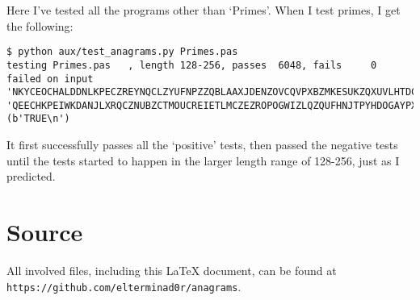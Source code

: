 \documentclass{article}
\begin{document}
    Here I've tested all the programs other than `Primes'. When I test primes,
    I get the following:

\begin{lstlisting}[caption=Testing `Primes']
$ python aux/test_anagrams.py Primes.pas
testing Primes.pas   , length 128-256, passes  6048, fails     0
failed on input 'NKYCEOCHALDDNLKPECZREYNQCLZYUFNPZZQBLAAXJDENZOVCQVPXBZMKESUKZQXUVLHTDCIJVAEQFHHWVVCDPJWSIOKIKUVJIGSKPQMDMUDDWFMZYPATESQNTBUYHRZDHBWADIXBCEKSQQYZVOEIXPZLOCIOVLQHDEKEPRAHQCOAEEMYUECGGCPACBRSQXT', 'QEECHKPEIWKDANJLXRQCZNUBZCTMOUCREIETLMCZEZROPOGWIZLQZQUFHNJTPYHDOGAYPXBBNSETCULSVCSKJBAYQAFYLQXECVQKDTVXANQODDHJMSQPDAHOXEZEZCSEGVXBMYLHUPIEISZNVKQCVCKKOHVRIWYIAKDBYAUVLMDEKVWPACDDHQZFPZQDUEC' (b'TRUE\n')
\end{lstlisting}
\iffalse $ \fi %

    It first successfully passes all the `positive' tests, then passed the
    negative tests until the tests started to happen in the larger length range
    of 128-256, just as I predicted.

    \section{Source}

    All involved files, including this \LaTeX{} document, can be found at
    \verb|https://github.com/elterminad0r/anagrams|.
\end{document}
